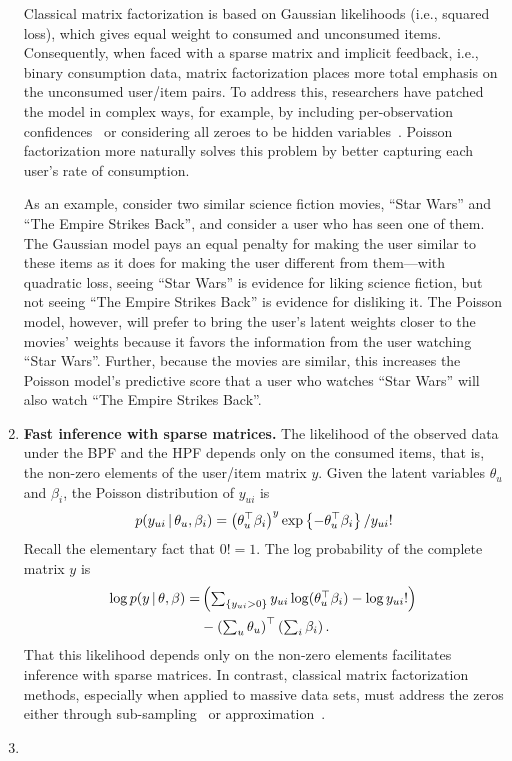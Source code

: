 \begin{enumerate}
Classical matrix factorization is based on Gaussian likelihoods (i.e.,
squared loss), which gives equal weight to consumed and unconsumed
items.  Consequently, when faced with a sparse matrix and implicit
feedback, i.e., binary consumption data, matrix factorization places
more total emphasis on the unconsumed user/item pairs.  To address
this, researchers have patched the model in complex ways, for example,
by including per-observation confidences~\cite{Koren:2009} or
considering all zeroes to be hidden variables~\cite{Paquet:2013p9197}.
Poisson factorization more naturally solves this problem by better
capturing each user's rate of consumption.

As an example, consider two similar science fiction movies, ``Star
Wars'' and ``The Empire Strikes Back'', and consider a user who has
seen one of them.  The Gaussian model pays an equal penalty for making
the user similar to these items as it does for making the user
different from them---with quadratic loss, seeing ``Star Wars'' is
evidence for liking science fiction, but not seeing ``The Empire
Strikes Back'' is evidence for disliking it.  The Poisson model,
however, will prefer to bring the user's latent weights closer to the
movies' weights because it favors the information from the user
watching ``Star Wars''. Further, because the movies are similar, this
increases the Poisson model's predictive score that a user who watches
``Star Wars'' will also watch ``The Empire Strikes Back''.

\item {\bf Fast inference with sparse matrices.}
The likelihood of the observed data under the BPF and the HPF depends
only on the consumed items, that is, the non-zero elements of the
user/item matrix $y$.  Given the latent variables $\theta_u$ and
$\beta_i$, the Poisson distribution of $y_{ui}$ is
\begin{equation}
  p(y_{ui} \,\vert\, \theta_u, \beta_i) =
  \left(\theta_u^\top \beta_i\right)^y
  \exp\left\{-\theta_u^\top \beta_i \right\} / y_{ui}!
\end{equation}
Recall the elementary fact that $0! = 1$.  The log probability of the
complete matrix $y$ is
\begin{align}
  \log p(y \,\vert\, \theta, \beta) =
  & \left(\textstyle \sum_{\{y_{ui} > 0\}}
    y_{ui} \log (\theta_u^\top \beta_i) - \log y_{ui}!
  \right) \\
  & -
  \left(\textstyle\sum_{u} \theta_u\right)^\top \left(\textstyle
    \sum_{i} \beta_i\right).
\end{align}
That this likelihood depends only on the non-zero elements facilitates
inference with sparse matrices.  In contrast, classical matrix
factorization methods, especially when applied to
massive data sets, must address the zeros either through
sub-sampling~\cite{Dror:2012a} or approximation~\cite{Hu:2008p9402}.

\item {\bf }

\end{enumerate}


